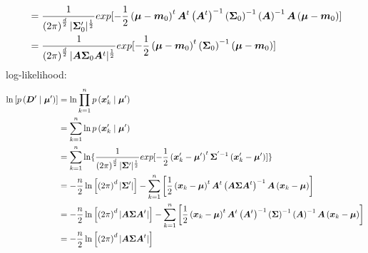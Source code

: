 \documentclass[a4paper,11pt,onecolumn,oneside,UTF8]{article}
\begin{document}
\begin{enumerate}
$$\begin{aligned}
                                        & = \frac{1}{\left(2\pi\right)^\frac{d}{2}|\bm\Sigma'_0|^\frac{1}{2}}
                  exp[-\frac{1}{2}\left(\bm\mu-\bm m_0\right)^t\bm A^t\bm \left(\bm A^t\right)^{-1}
                  \left(\bm\Sigma_0\right)^{-1}\left(\bm A\right)^{-1}\bm A\left(\bm\mu-\bm m_0\right)]          \\
                                        & = \frac{1}{\left(2\pi\right)^\frac{d}{2}|\bm A\bm\Sigma_0
                      \bm A^t|^\frac{1}{2}}exp[-\frac{1}{2}\left(\bm\mu-\bm m_0\right)^t\bm
                  \left(\bm\Sigma_0\right)^{-1}\left(\bm\mu-\bm m_0\right)]                                      \\
              \end{aligned}
          $$
          log-likelihood:
          $$
              \begin{aligned}
                  \begin{aligned}
                      \ln\left[p\left(\bm D' \mid \bm\mu'\right)\right]
                       & = \ln \prod\limits_{k=1}^np\left(\bm x'_k \mid \bm \mu' \right)                    \\
                       & = \sum\limits_{k=1}^n \ln p\left(\bm x'_k \mid \bm \mu' \right)                    \\
                       & = \sum\limits_{k=1}^n \ln \{ \frac{1}{\left(2\pi\right)^\frac{d}{2}|\bm\Sigma'|^
                          \frac{1}{2}}exp[-\frac{1}{2}\left(\bm x'_k-\bm\mu'\right)^t\bm\Sigma^{'-1}
                      \left(\bm x'_k-\bm \mu'\right)] \}                                                    \\
                       & = -\frac{n}{2}\ln \left[\left(2\pi\right)^d|\bm\Sigma'|\right]-\sum\limits_{k=1}^n
                      \left[\frac{1}{2}\left(\bm x_k-\bm\mu\right)^t\bm A^t\left(\bm A\bm\Sigma\bm A^t
                      \right)^{-1}\bm A\left(\bm x_k-\bm \mu\right)\right]                                  \\
                       & = -\frac{n}{2}\ln \left[\left(2\pi\right)^d|\bm A\bm\Sigma\bm A^t|\right]
                      -\sum\limits_{k=1}^n \left[\frac{1}{2}\left(\bm x_k-\bm\mu\right)^t\bm A^t\bm
                          \left(\bm A^t\right)^{-1}\left(\bm\Sigma\right)^{-1}\left(\bm A\right)^{-1}
                      \bm A\left(\bm x_k-\bm \mu\right)\right]                                              \\
                       & = -\frac{n}{2}\ln \left[\left(2\pi\right)^d|\bm A\bm\Sigma\bm A^t|\right]

\end{aligned}
\end{aligned}$$
\end{enumerate}
\end{document}
